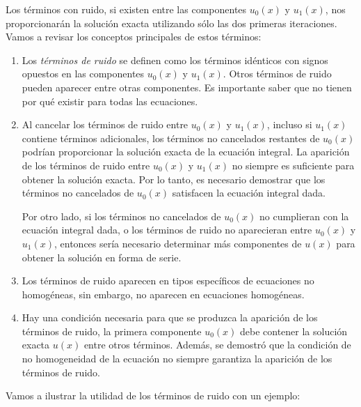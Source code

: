 Los términos con ruido, si existen entre las componentes $u_0(x)$ y $u_1(x)$, nos proporcionarán la solución exacta utilizando sólo las dos primeras iteraciones. Vamos a revisar los conceptos principales de estos términos:
\begin{enumerate}
	\item Los \textit{términos de ruido} se definen como los términos idénticos con signos opuestos en las componentes $u_0(x)$ y $u_1(x)$. Otros términos de ruido pueden aparecer entre otras componentes. Es importante saber que no tienen por qué existir para todas las ecuaciones.
	\item Al cancelar los términos de ruido entre $u_0(x)$ y $u_1(x)$, incluso si $u_1(x)$ contiene términos adicionales, los términos no cancelados restantes de $u_0(x)$ podrían proporcionar la solución exacta de la ecuación integral. La aparición de los términos de ruido entre $u_0(x)$ y $u_1(x)$ no siempre es suficiente para obtener la solución exacta. Por lo tanto, es necesario demostrar que los términos no cancelados de $u_0(x)$ satisfacen la ecuación integral dada. 
	
	Por otro lado, si los términos no cancelados de $u_0(x)$ no cumplieran con la ecuación integral dada, o los términos de ruido no aparecieran entre $u_0(x)$ y $u_1(x)$, entonces sería necesario determinar más componentes de $u(x)$ para obtener la solución en forma de serie.
	\item Los términos de ruido aparecen en tipos específicos de ecuaciones no homogéneas, sin embargo, no aparecen en ecuaciones homogéneas.
	\item Hay una condición necesaria para que se produzca la aparición de los términos de ruido, la primera componente $u_0(x)$ debe contener la solución exacta $u(x)$ entre otros términos. Además, se demostró que la condición de no homogeneidad de la ecuación no siempre garantiza la aparición de los términos de ruido.
\end{enumerate}
Vamos a ilustrar la utilidad de los términos de ruido con un ejemplo:
